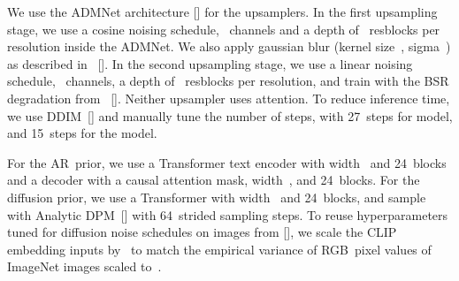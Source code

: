 \documentclass{article}
\newcommand{\shortcite}[1]{[\citenum{#1}]}
\newcommand{\namecite}[1]{\citeauthor{#1} [\citenum{#1}]}
\begin{document}
We use the ADMNet architecture \shortcite{sotapaper} for the upsamplers. In the first upsampling stage, we use a cosine noising schedule, ~channels and a depth of ~resblocks per resolution inside the ADMNet. We also apply gaussian blur (kernel size~, sigma~) as described in~\namecite{sr3}. In the second upsampling stage, we use a linear noising schedule, ~channels, a depth of ~resblocks per resolution, and train with the BSR degradation from~\namecite{latentdiffusion}. Neither upsampler uses attention. To reduce inference time, we use DDIM~\shortcite{ddim} and manually tune the number of steps, with 27~steps for  model, and 15~steps for the  model.

For the AR~prior, we use a Transformer text encoder with width~ and 24~blocks and a decoder with a causal attention mask, width~, and 24~blocks. For the diffusion prior, we use a Transformer with width~ and 24~blocks, and sample with Analytic DPM~\shortcite{analyticddpm} with 64~strided sampling steps. To reuse hyperparameters tuned for diffusion noise schedules on images from \namecite{sotapaper}, we scale the CLIP embedding inputs by~ to match the empirical variance of RGB~pixel values of ImageNet images scaled to~. 
\end{document}
